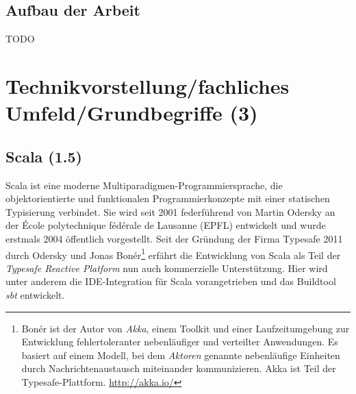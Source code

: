 \documentclass[a4paper, 12pt, hidelinks, listof=totoc, listoftables=totoc, bibliography=totoc]{scrreprt}
\begin{document}
\section{Aufbau der Arbeit}

TODO






















\chapter{Technikvorstellung/fachliches Umfeld/Grundbegriffe (3)}

\section{Scala (1.5)}



Scala ist eine moderne Multiparadigmen-Programmiersprache, die objektorientierte und funktionalen Programmierkonzepte mit einer statischen Typisierung verbindet. Sie wird seit 2001 federführend von Martin Odersky an der École polytechnique fédérale de Lausanne (EPFL) entwickelt und wurde erstmals 2004 öffentlich vorgestellt.
Seit der Gründung der Firma Typesafe 2011 durch Odersky und Jonas Bonér\footnote{Bonér ist der Autor von \textit{Akka}, einem Toolkit und einer Laufzeitumgebung zur Entwicklung fehlertoleranter nebenläufiger und verteilter Anwendungen. Es basiert auf einem Modell, bei dem \textit{Aktoren} genannte nebenläufige Einheiten durch Nachrichtenaustausch miteinander kommunizieren. Akka ist Teil der Typesafe-Plattform. \url{http://akka.io/}} erfährt die Entwicklung von Scala als Teil der \textit{Typesafe Reactive Platform} nun auch kommerzielle Unterstützung.
Hier wird unter anderem die IDE-Integration für Scala vorangetrieben und das Buildtool \textit{sbt} entwickelt.\cite{scala-lang2011.CSS} 
\end{document}

